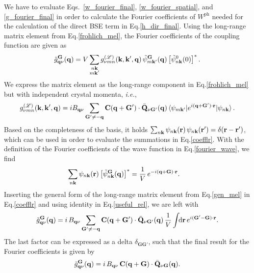  We have to evaluate Eqs.~\eqref{w_fourier_final}, \eqref{w_fourier_spatial}, and \eqref{g_fourier_final}  in order to calculate the Fourier coefficients of $W^\text{ph}$ needed for the calculation of the direct BSE term in Eq.\;\eqref{h_dir_final}. Using the long-range matrix element from Eq.\;\eqref{frohlich_mel}, the Fourier coefficients of the coupling function are given as
%
\begin{equation}\label{coefflr}
  \Tilde{g}_{\mathbf{q}\nu}^{\mathbf{G}}(\mathbf{q}) =  V\sum_{\substack{n\mathbf{k} \\ m\mathbf{k}'}} g^{(\mathcal{L})}_{\nu mn}(\mathbf{k,k',q})\,\Tilde{\psi}_{m\mathbf{k}'}^{\mathbf{G}}(\mathbf{q}) \left[\Tilde{\psi}^0_{n\mathbf{k}}(0)\right]^*.
\end{equation}
%
We express the matrix element as the long-range component in Eq.\;\eqref{frohlich_mel} but with independent crystal momenta, \textit{i.e.},
%
\begin{equation}\label{gen_mel}
  g^{(\mathcal{L})}_{\nu mn}(\mathbf{k,k',q}) = i B_{\mathbf{q}\nu}\sum_\mathbf{G'\neq -q}\mathbf{C(q+G')}\cdot\bar{\mathbf{Q}}_{\nu\mathbf{G'}}(\mathbf{q}) \mel{\psi_{m\mathbf{k'}}}{e^{i\mathbf{(q+G')\cdot r}}}{\psi_{n\mathbf{k}}}. 
\end{equation}
%
Based on the completeness of the basis, it holds $\sum_{n\mathbf{k}}\psi_{n\mathbf{k}}(\mathbf{r})\,\psi_{n\mathbf{k}}(\mathbf{r}')=\delta(\mathbf{r-r'})$, which can be used in order to evaluate the summations in Eq.\;\eqref{coefflr}. With the definition of the Fourier coefficients of the wave function  in Eq.\;\eqref{fourier_wave}, we find
%
\begin{align}\label{useful_rel}
    \sum_{n\mathbf{k}}\psi_{n\mathbf{k}}(\mathbf{r})\left[\Tilde{\psi}_{n\mathbf{k}}^{\mathbf{G}}(\mathbf{q})\right]^* & = \frac{1}{V}\,e^{-i\mathbf{(q+G)\cdot r}}.
\end{align}
%
Inserting the general form of the long-range matrix element from Eq.\;\eqref{gen_mel} in Eq.\;\eqref{coefflr} and using identity in Eq.\;\eqref{useful_rel}, we are left with
%
\begin{equation}\label{coefflr2}
  \Tilde{g}_{\mathbf{q}\nu}^{\mathbf{G}}(\mathbf{q}) =  i\,B_{\mathbf{q}\nu}\sum_\mathbf{G'\neq -q}\mathbf{C(q+G')}\cdot\bar{\mathbf{Q}}_{\nu\mathbf{G'}}(\mathbf{q})\,\frac{1}{V}\int\text{\!\!d}\mathbf{r}\,e^{i\mathbf{(G'-G)\cdot r}}.
\end{equation}
The last factor can be expressed as a delta $\delta_{\mathbf{GG'}}$, such that the final result for the Fourier coefficients is given by
%
\begin{align}\label{g_fourier_lr}
    \Tilde{g}_{\mathbf{q}\nu}^{\mathbf{G}}(\mathbf{q}) =  i\, B_{\mathbf{q}\nu}\,\mathbf{C(q+G)}\cdot\bar{\mathbf{Q}}_{\nu\mathbf{G}}(\mathbf{q}).
\end{align}
